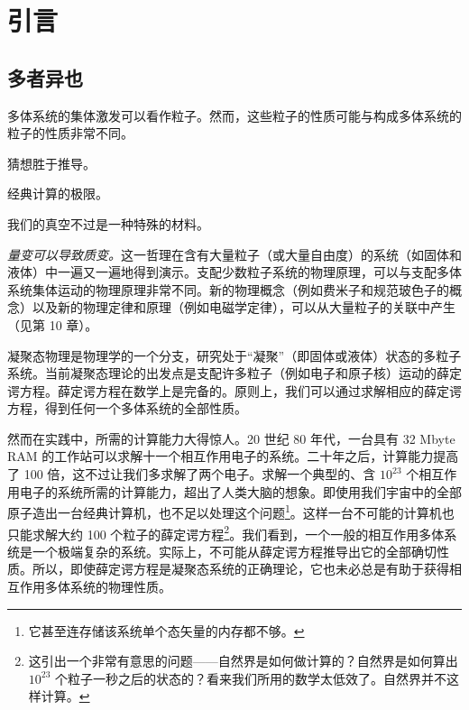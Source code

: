 

\chapter{引言}

\section{多者异也}

\begin{keypoints}
\item 多体系统的集体激发可以看作粒子。然而，这些粒子的性质可能与构成多体系统的粒子的性质非常不同。
\item 猜想胜于推导。
\item 经典计算的极限。
\item 我们的真空不过是一种特殊的材料。
\end{keypoints}

\emph{量变可以导致质变。}这一哲理在含有大量粒子（或大量自由度）的系统（如固体和液体）中一遍又一遍地得到演示。支配少数粒子系统的物理原理，可以与支配多体系统集体运动的物理原理非常不同。新的物理概念（例如费米子和规范玻色子的概念）以及新的物理定律和原理（例如电磁学定律），可以从大量粒子的关联中产生（见第 10 章）。

凝聚态物理是物理学的一个分支，研究处于“凝聚”（即固体或液体）状态的多粒子系统。当前凝聚态理论的出发点是支配许多粒子（例如电子和原子核）运动的薛定谔方程。薛定谔方程在数学上是完备的。原则上，我们可以通过求解相应的薛定谔方程，得到任何一个多体系统的全部性质。

然而在实践中，所需的计算能力大得惊人。20 世纪 80 年代，一台具有 32 Mbyte RAM 的工作站可以求解十一个相互作用电子的系统。二十年之后，计算能力提高了 100 倍，这不过让我们多求解了两个电子。求解一个典型的、含 $10^{23}$ 个相互作用电子的系统所需的计算能力，超出了人类大脑的想象。即使用我们宇宙中的全部原子造出一台经典计算机，也不足以处理这个问题\footnote{它甚至连存储该系统单个态矢量的内存都不够。}。这样一台不可能的计算机也只能求解大约 100 个粒子的薛定谔方程\footnote{这引出一个非常有意思的问题——自然界是如何做计算的？自然界是如何算出 $10^{23}$ 个粒子一秒之后的状态的？看来我们所用的数学太低效了。自然界并不这样计算。}。我们看到，一个一般的相互作用多体系统是一个极端复杂的系统。实际上，不可能从薛定谔方程推导出它的全部确切性质。所以，即使薛定谔方程是凝聚态系统的正确理论，它也未必总是有助于获得相互作用多体系统的物理性质。

